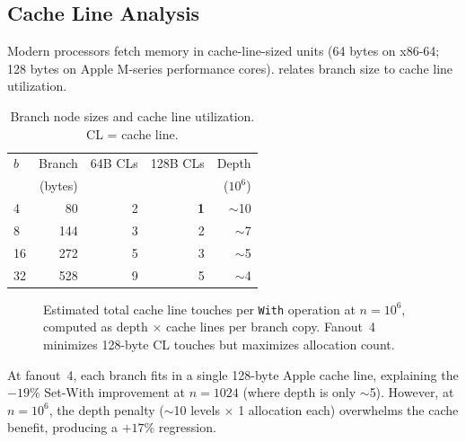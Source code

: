 \documentclass[11pt,twocolumn]{article}
\begin{document}
\subsection{Cache Line Analysis}
\label{sec:cacheline}

Modern processors fetch memory in cache-line-sized units (64 bytes on
x86-64; 128 bytes on Apple M-series performance cores).
 relates branch size to cache line utilization.

\begin{table}[h]
\centering
\caption{Branch node sizes and cache line utilization. CL = cache line.}
\label{tab:cacheline}
\begin{tabular}{@{}lrrrr@{}}
\toprule
$b$ & Branch & 64B CLs & 128B CLs & Depth \\
    & (bytes) &         &           & ($10^6$) \\
\midrule
4   & 80   & 2 & \textbf{1} & $\sim$10 \\
8   & 144  & 3 & 2 & $\sim$7 \\
16  & 272  & 5 & 3 & $\sim$5 \\
32  & 528  & 9 & 5 & $\sim$4 \\
\bottomrule
\end{tabular}
\end{table}

\begin{figure}[h]
\centering
{}
\caption{Estimated total cache line touches per \texttt{With} operation at
  $n = 10^6$, computed as depth $\times$ cache lines per branch copy.
  Fanout~4 minimizes 128-byte CL touches but maximizes allocation count.}
\label{fig:cacheline}
\end{figure}

At fanout~4, each branch fits in a single 128-byte Apple cache line,
explaining the $-19\%$ Set-With improvement at $n = 1024$ (where depth is
only $\sim$5).
However, at $n = 10^6$, the depth penalty ($\sim$10 levels $\times$ 1
allocation each) overwhelms the cache benefit, producing a $+17\%$
regression.
\end{document}
